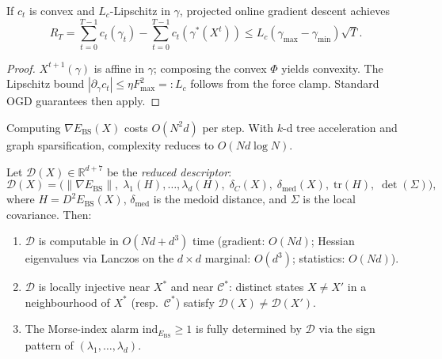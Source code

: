 \documentclass[final]{siamltex}
\newcommand{\R}{\mathbb{R}}
\newcommand{\norm}[1]{\lVert #1 \rVert}
\providecommand{\grad}{\nabla}
\newcommand{\Ebs}{E_{\mathrm{BS}}}
\newcommand{\Cman}{\mathcal{C}^*}
\newcommand{\Xst}{X^*}
\begin{document}
\begin{proposition}\label{prop:regret}
If $c_t$ is convex and $L_c$-Lipschitz in $\gamma$, projected
online gradient descent achieves
\begin{equation}\label{eq:regret}
  R_T = \sum_{t=0}^{T-1}c_t(\gamma_t)
  - \sum_{t=0}^{T-1}c_t(\gamma^*(X^t))
  \le L_c(\gamma_{\max}-\gamma_{\min})\sqrt{T}.
\end{equation}
\end{proposition}

\begin{proof}
$X^{t+1}(\gamma)$ is affine in $\gamma$; composing the convex
$\Phi$ yields convexity. The Lipschitz bound
$|\partial_\gamma c_t|\le\eta F_{\max}^2=:L_c$ follows from the
force clamp. Standard OGD guarantees
\cite{hazan2016oco,shalev2012online} then apply.
\end{proof}

\begin{proposition}\label{prop:complexity}
Computing $\grad\Ebs(X)$ costs $O(N^2 d)$ per step. With $k$-d
tree acceleration and graph sparsification, complexity reduces to
$O(Nd\log N)$.
\end{proposition}

\begin{proposition}\label{prop:reduced}
Let $\mathcal{D}(X)\in\R^{d+7}$ be the \emph{reduced descriptor}:
\begin{equation}\label{eq:reduced}
  \mathcal{D}(X) = \bigl(\norm{\grad\Ebs},\;
  \lambda_1(H),\ldots,\lambda_d(H),\;
  \delta_C(X),\;\delta_{\mathrm{med}}(X),\;
  \mathrm{tr}(H),\;\det(\Sigma)\bigr),
\end{equation}
where $H = D^2\Ebs(X)$, $\delta_{\mathrm{med}}$ is the medoid
distance, and $\Sigma$ is the local covariance.  Then:
\begin{enumerate}
\item[\textup{(i)}] $\mathcal{D}$ is computable in $O(Nd + d^3)$
  time (gradient: $O(Nd)$; Hessian eigenvalues via Lanczos on
  the $d\times d$ marginal: $O(d^3)$; statistics: $O(Nd)$).
\item[\textup{(ii)}] $\mathcal{D}$ is locally injective near
  $\Xst$ and near $\Cman$: distinct states $X \neq X'$ in a
  neighbourhood of $\Xst$ (resp.\ $\Cman$) satisfy
  $\mathcal{D}(X) \neq \mathcal{D}(X')$.
\item[\textup{(iii)}] The Morse-index alarm
  $\mathrm{ind}_{\Ebs} \ge 1$ is fully determined by
  $\mathcal{D}$ via the sign pattern of
  $(\lambda_1,\ldots,\lambda_d)$.
\end{enumerate}
\end{proposition}
\end{document}
